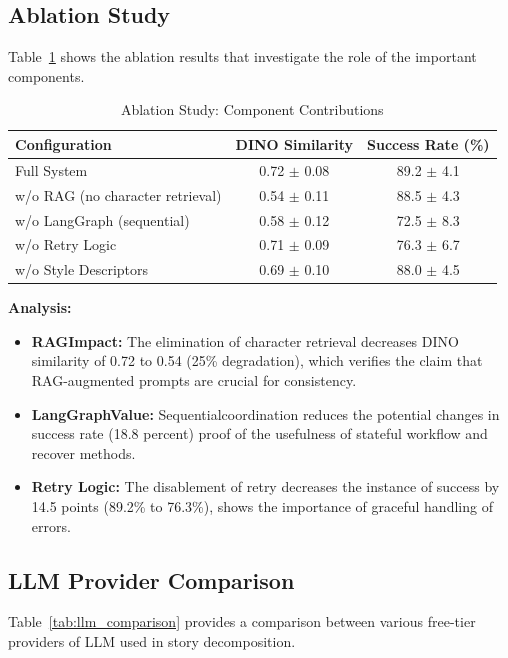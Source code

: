 \documentclass[runningheads]{llncs}
\begin{document}
\subsection{Ablation Study}

Table~\ref{tab:ablation} shows the ablation results that investigate the role of the important components.

\begin{table}[t]
\centering
\caption{Ablation Study: Component Contributions}
\label{tab:ablation}
\begin{tabular}{lcc}
\toprule
\textbf{Configuration} & \textbf{DINO Similarity} & \textbf{Success Rate (\%)} \\
\midrule
Full System & 0.72 $\pm$ 0.08 & 89.2 $\pm$ 4.1 \\
w/o RAG (no character retrieval) & 0.54 $\pm$ 0.11 & 88.5 $\pm$ 4.3 \\
w/o LangGraph (sequential) & 0.58 $\pm$ 0.12 & 72.5 $\pm$ 8.3 \\
w/o Retry Logic & 0.71 $\pm$ 0.09 & 76.3 $\pm$ 6.7 \\
w/o Style Descriptors & 0.69 $\pm$ 0.10 & 88.0 $\pm$ 4.5 \\
\bottomrule
\end{tabular}
\end{table}

\textbf{Analysis:}
\begin{itemize}
\item \textbf{RAGImpact:} The elimination of character retrieval decreases DINO similarity of 0.72 to 0.54 (25\% degradation), which verifies the claim that RAG-augmented prompts are crucial for consistency.
\item \textbf{LangGraphValue:} Sequentialcoordination reduces the potential changes in success rate (18.8 percent) proof of the usefulness of stateful workflow and recover methods.
\item \textbf{Retry Logic:} The disablement of retry decreases the instance of success by 14.5 points (89.2\% to 76.3\%), shows the importance of graceful handling of errors.
\end{itemize}

\subsection{LLM Provider Comparison}

Table~\ref{tab:llm_comparison} provides a comparison between various free-tier providers of LLM used in story decomposition.
\end{document}
